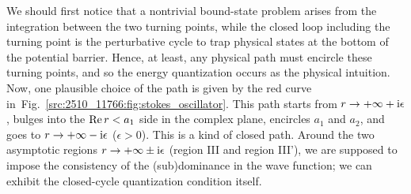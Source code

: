 We should first notice that a nontrivial bound-state problem arises from the integration between the two turning points, while the closed loop including the turning point is the perturbative cycle to trap physical states at the bottom of the potential barrier.
Hence, at least, any physical path must encircle these turning points, and so the energy quantization occurs as the physical intuition.
Now, one plausible choice of the path is given by the red curve in~Fig.~\ref{src:2510_11766:fig:stokes_oscillator}.
This path starts from $r\to+\infty+\mathrm{i}\epsilon$, bulges into the $\operatorname{Re} r<a_1$ side in the complex plane, encircles $a_1$ and $a_2$, and goes to $r\to+\infty-\mathrm{i}\epsilon$ ($\epsilon>0$).
This is a kind of closed path.
Around the two asymptotic regions $r\to+\infty\pm \mathrm{i}\epsilon$ (region III and region III'), we are supposed to impose the consistency of the (sub)dominance in the wave function; we can exhibit the closed-cycle quantization condition itself.

